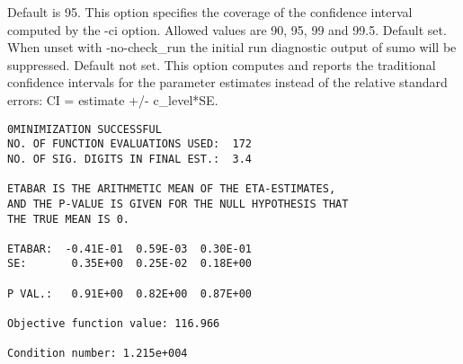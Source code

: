 \begin{optionlist}
Default is 95. This option specifies the coverage of the confidence interval computed by the -ci option. Allowed values are 90, 95, 99 and 99.5. 
\nextopt
{}
Default set. When unset with -no-check\_run the initial run diagnostic output of sumo will be suppressed. 
\nextopt
{}
Default not set. This option computes and reports the traditional confidence intervals for the parameter estimates instead of the relative standard errors: CI = estimate +/- c\_level*SE. 
\begin{verbatim}
0MINIMIZATION SUCCESSFUL
NO. OF FUNCTION EVALUATIONS USED:  172
NO. OF SIG. DIGITS IN FINAL EST.:  3.4

ETABAR IS THE ARITHMETIC MEAN OF THE ETA-ESTIMATES,
AND THE P-VALUE IS GIVEN FOR THE NULL HYPOTHESIS THAT 
THE TRUE MEAN IS 0.

ETABAR:  -0.41E-01  0.59E-03  0.30E-01
SE:       0.35E+00  0.25E-02  0.18E+00

P VAL.:   0.91E+00  0.82E+00  0.87E+00

Objective function value: 116.966

Condition number: 1.215e+004


\end{verbatim}
\end{optionlist}
